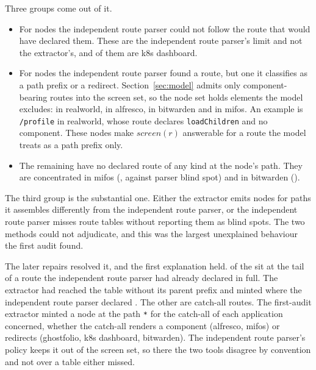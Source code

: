 Three groups come out of it.
\begin{itemize}
\item For \NodeAuditBlindAll{} nodes the independent route parser could not follow the route that would have declared them. These are the independent route parser's limit and not the extractor's, and \NodeAuditBlindKdash{} of them are k8s dashboard.
\item For \NodeAuditOutsideSAll{} nodes the independent route parser found a route, but one it classifies as a path prefix or a redirect. Section~\ref{sec:model} admits only component-bearing routes into the screen set, so the node set holds elements the model excludes: \NodeAuditOutsideSRealworld{} in realworld, \NodeAuditOutsideSAlfresco{} in alfresco, \NodeAuditOutsideSBitwarden{} in bitwarden and \NodeAuditOutsideSMifos{} in mifos. An example is \texttt{/profile} in realworld, whose route declares \texttt{loadChildren} and no component. These nodes make $\mathit{screen}(r)$ answerable for a route the model treats as a path prefix only.
\item The remaining \RoundTwoFirstRoundExtra{} have no declared route of any kind at the node's path. They are concentrated in mifos (\NodeAuditNoRouteMifos{}, against \NodeAuditBlindSpotsMifos{} parser blind spot) and in bitwarden (\NodeAuditNoRouteBitwarden{}).
\end{itemize}

The third group is the substantial one. Either the extractor emits nodes for paths it assembles differently from the independent route parser, or the independent route parser misses route tables without reporting them as blind spots. The two methods could not adjudicate, and this was the largest unexplained behaviour the first audit found.

The later repairs resolved it, and the first explanation held. \RoundTwoFirstRoundTruncated{} of the \RoundTwoFirstRoundExtra{} sit at the tail of a route the independent route parser had already declared in full. The extractor had reached the table without its parent prefix and minted  where the independent route parser declared . The other \RoundTwoFirstRoundSynthetic{} are catch-all routes. The first-audit extractor minted a node at the path \texttt{*} for the catch-all of each application concerned, whether the catch-all renders a component (alfresco, mifos) or redirects (ghostfolio, k8s dashboard, bitwarden). The independent route parser's policy keeps it out of the screen set, so there the two tools disagree by convention and not over a table either missed.


